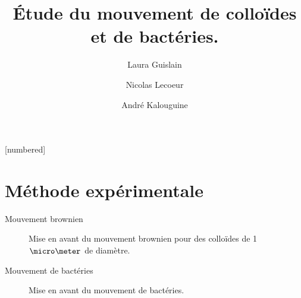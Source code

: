 \documentclass[11pt]{beamer}
\begin{document}
	\author{Laura Guislain \and Nicolas Lecoeur \and André Kalouguine}
	\title{Étude du mouvement de colloïdes et de bactéries.}
	\subject{Caractérisation du mouvement bactérien et comparaison au mouvement brownien.}
	[numbered]
\begin{frame}[plain]
	\maketitle
\end{frame}
\addtocounter{framenumber}{-1}


\section{Méthode expérimentale}

\begin{frame}{Mouvement brownien}
\renewcommand{\figurename}{Film}
\begin{figure}
	\centering
    \caption{Mise en avant du mouvement brownien pour des colloïdes de 1$\micro \meter$ de diamètre.}
    \label{mov:movie_col}
\end{figure}
\end{frame}

\begin{frame}{Mouvement de bactéries}
\begin{figure}
\renewcommand{\figurename}{Film}
	\centering
	\caption{Mise en avant du mouvement de bactéries.}
	\label{mov:movie_bac}
\end{figure}
\end{frame}
\end{document}
